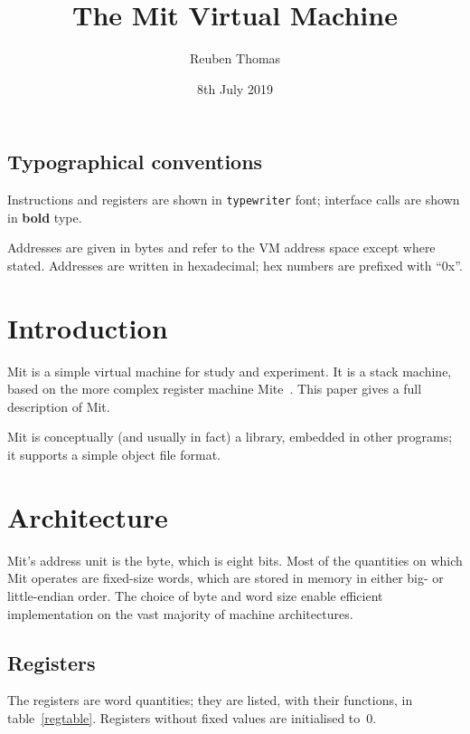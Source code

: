 \documentclass[a4paper]{article}
\title{The Mit Virtual Machine}
\author{Reuben Thomas}
\date{8th July 2019}
\begin{document}
\maketitle

\subsection*{Typographical conventions}

Instructions and registers are shown in {\tt typewriter} font;
interface calls are shown in {\bf bold} type.

Addresses are given in bytes and refer to the VM address space except where
stated. Addresses are written in hexadecimal; hex numbers are prefixed with
“0x”.


\section{Introduction}

Mit is a simple virtual machine for study and experiment. It is a stack machine, based on the more complex register machine Mite~\cite{mite0}.
This paper gives a full description of Mit.

Mit is conceptually (and usually in fact) a library, embedded in other programs; it supports a simple object file format.


\section{Architecture}

Mit's address unit is the byte, which is eight bits.
Most of the quantities on which Mit operates are fixed-size words, which are stored in memory in either big- or little-endian order.
The choice of byte and word size enable efficient implementation on the vast majority of machine architectures.


\subsection{Registers}
\label{registers}

The registers are word quantities; they are listed, with their functions, in table~\ref{regtable}. Registers without fixed values are initialised to~$0$.
\end{document}
